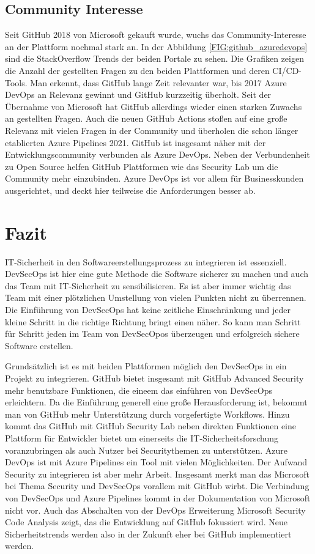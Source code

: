\section{Community Interesse}
Seit GitHub 2018 von Microsoft gekauft wurde, wuchs das Community-Interesse an der Plattform nochmal stark an. In der Abbildung \ref{FIG:github_azuredevops} sind die StackOverflow Trends der beiden Portale zu sehen. Die Grafiken zeigen die Anzahl der gestellten Fragen zu den beiden Plattformen und deren CI/CD-Tools. Man erkennt, dass GitHub lange Zeit relevanter war, bis 2017 Azure DevOps an Relevanz gewinnt und GitHub kurzzeitig überholt. Seit der Übernahme von Microsoft hat GitHub allerdings wieder einen starken Zuwachs an gestellten Fragen. Auch die neuen GitHub Actions stoßen auf eine große Relevanz mit vielen Fragen in der Community und überholen die schon länger etablierten Azure Pipelines 2021. GitHub ist insgesamt näher mit der Entwicklungscommunity verbunden als Azure DevOps. Neben der Verbundenheit zu Open Source helfen GitHub Plattformen wie das Security Lab um die Community mehr einzubinden. Azure DevOps ist vor allem für Businesskunden ausgerichtet, und deckt hier teilweise die Anforderungen besser ab.

\chapter{Fazit}
IT-Sicherheit in den Softwareerstellungsprozess zu integrieren ist essenziell. DevSecOps ist hier eine gute Methode die Software sicherer zu machen und auch das Team mit IT-Sicherheit zu sensibilisieren. Es ist aber immer wichtig das Team mit einer plötzlichen Umstellung von vielen Punkten nicht zu überrennen. Die Einführung von DevSecOps hat keine zeitliche Einschränkung und jeder kleine Schritt in die richtige Richtung bringt einen näher. So kann man Schritt für Schritt jeden im Team von DevSecOpos überzeugen und erfolgreich sichere Software erstellen.

Grundsätzlich ist es mit beiden Plattformen möglich den DevSecOps in ein Projekt zu integrieren. GitHub bietet insgesamt mit GitHub Advanced Security mehr benutzbare Funktionen, die eineem das einführen von DevSecOps erleichtern. Da die Einführung generell eine große Herausforderung ist, bekommt man von GitHub mehr Unterstützung durch vorgefertigte Workflows. Hinzu kommt das GitHub mit GitHub Security Lab neben direkten Funktionen eine Plattform für Entwickler bietet um einerseits die IT-Sicherheitsforschung voranzubringen als auch Nutzer bei Securitythemen zu unterstützen.
Azure DevOps ist mit Azure Pipelines ein Tool mit vielen Möglichkeiten. Der Aufwand Security zu integrieren ist aber mehr Arbeit.
Insgesamt merkt man das Microsoft bei Thema Security und  DevSecOps vorallem mit GitHub wirbt. Die Verbindung von DevSecOps und Azure Pipelines kommt in der Dokumentation von Microsoft nicht vor. Auch das Abschalten von der DevOps Erweiterung Microsoft Security Code Analysis zeigt, das die Entwicklung auf GitHub fokussiert wird. Neue Sicherheitstrends werden also in der Zukunft eher bei GitHub implementiert werden.